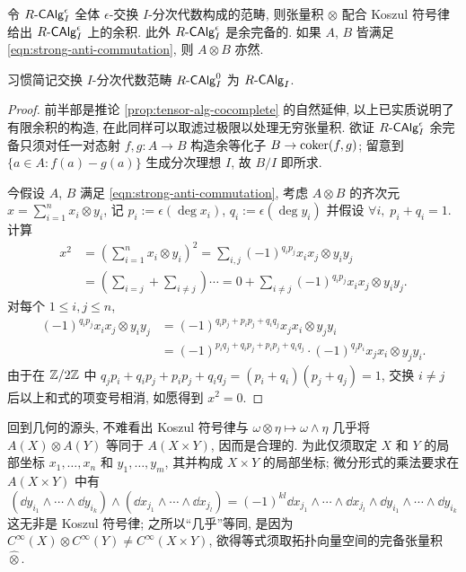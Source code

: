 \begin{proposition}\label{prop:graded-alg-cocomplete}
	令 $R\text{-}\mathsf{CAlg}^\epsilon_I$ 全体 $\epsilon$-交换 $I$-分次代数构成的范畴, 则张量积 $\otimes$ 配合 Koszul 符号律给出 $R\text{-}\mathsf{CAlg}^\epsilon_I$ 上的余积. 此外 $R\text{-}\mathsf{CAlg}^\epsilon_I$ 是余完备的. 如果 $A$, $B$ 皆满足 \eqref{eqn:strong-anti-commutation}, 则 $A \otimes B$ 亦然.
\end{proposition}
习惯简记交换 $I$-分次代数范畴 $R\text{-}\mathsf{CAlg}^0_I$ 为 $R\text{-}\mathsf{CAlg}_I$.
\begin{proof}
	前半部是推论 \ref{prop:tensor-alg-cocomplete} 的自然延伸, 以上已实质说明了有限余积的构造, 在此同样可以取滤过极限以处理无穷张量积. 欲证 $R\text{-}\mathsf{CAlg}^\epsilon_I$ 余完备只须对任一对态射 $f,g: A \to B$ 构造余等化子 $B \to \operatorname{coker}(f,g)$; 留意到 $\{a \in A:f(a)-g(a) \}$ 生成分次理想 $I$, 故 $B/I$ 即所求.
	
	今假设 $A$, $B$ 满足 \eqref{eqn:strong-anti-commutation}, 考虑 $A \otimes B$ 的齐次元 $x = \sum_{i=1}^n x_i \otimes y_i$, 记 $p_i := \epsilon(\deg x_i)$, $q_i := \epsilon(\deg y_i)$ 并假设 $\forall i,\; p_i+q_i=1$. 计算
	\begin{align*}
		x^2 & = \left( \sum_{i=1}^n x_i \otimes y_i \right)^2 = \sum_{i,j} (-1)^{q_i p_j} x_i x_j \otimes y_i y_j \\
		& = \left( \sum_{i=j} + \sum_{i \neq j} \right) \cdots
		= 0 + \sum_{i \neq j} (-1)^{q_i p_j} x_i x_j \otimes y_i y_j.
	\end{align*}
	对每个 $1 \leq i,j \leq n$,
	\begin{align*}
		(-1)^{q_i p_j} x_i x_j \otimes y_i y_j & = (-1)^{q_i p_j + p_i p_j + q_i q_j} x_j x_i \otimes y_j y_i \\
		& = (-1)^{p_i q_j + q_i p_j + p_i p_j + q_i q_j} \cdot (-1)^{q_j p_i} x_j x_i \otimes y_j y_i.
	\end{align*}
	由于在 $\mathbb{Z}/2\mathbb{Z}$ 中 $q_j p_i + q_i p_j + p_i p_j + q_i q_j = (p_i + q_i)(p_j + q_j) = 1$, 交换 $i \neq j$ 后以上和式的项变号相消, 如愿得到 $x^2=0$.
\end{proof}

回到几何的源头, 不难看出 Koszul 符号律与 $\omega \otimes \eta \mapsto \omega \wedge \eta$ 几乎将 $A(X) \otimes A(Y)$ 等同于 $A(X \times Y)$, 因而是合理的. 为此仅须取定 $X$ 和 $Y$ 的局部坐标 $x_1, \ldots, x_n$ 和 $y_1, \ldots, y_m$, 其并构成 $X \times Y$ 的局部坐标; 微分形式的乘法要求在 $A(X \times Y)$ 中有
\[ \left( \dd y_{i_1} \wedge \cdots \wedge \dd y_{i_k} \right) \wedge \left( \dd  x_{j_1} \wedge \cdots \wedge \dd x_{j_l} \right) = (-1)^{kl} \dd x_{j_1} \wedge \cdots \wedge \dd x_{j_l} \wedge \dd y_{i_1} \wedge \cdots \wedge \dd y_{i_k} \]
这无非是 Koszul 符号律; 之所以``几乎''等同, 是因为 $C^\infty(X) \otimes C^\infty(Y) \neq C^\infty(X \times Y)$, 欲得等式须取拓扑向量空间的完备张量积 $\hat{\otimes}$.

